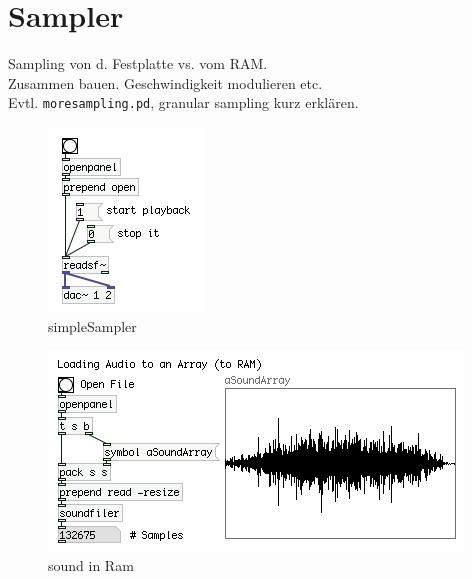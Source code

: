 \section{Sampler}

Sampling von d. Festplatte vs. vom RAM.\\
Zusammen bauen. Geschwindigkeit modulieren etc.\\
Evtl. \texttt{moresampling.pd}, granular sampling kurz erklären.


\begin{figure}[H]
	\begin{center}
		\includegraphics[scale = 1]{img/sampler.png}
		\caption{simpleSampler}
		\label{fig:simpleSampler}
	\end{center}
\end{figure}

\begin{figure}[H]
	\begin{center}
		\includegraphics[scale = 1]{img/soundFileToRam.png}
		\caption{sound in Ram}
		\label{fig:soundRam}
	\end{center}
\end{figure}


